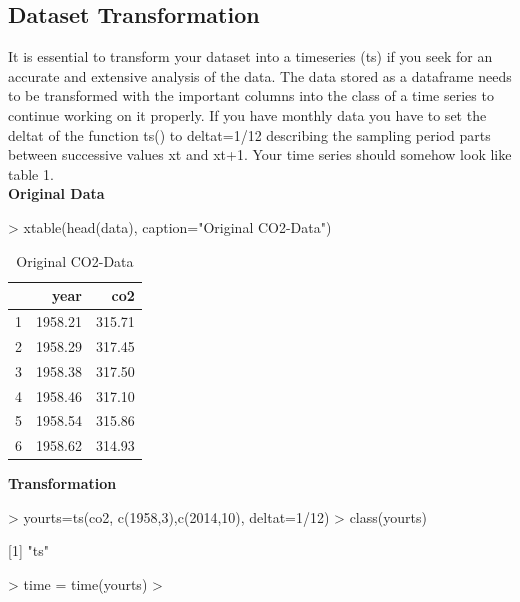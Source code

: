 \documentclass[11pt, a4paper]{article} %
\begin{document}
\subsection{Dataset Transformation}
It is essential to transform your dataset into a timeseries (ts) if you seek for an accurate and extensive analysis of the data.
\noindent The data stored as a dataframe needs to be transformed with the important columns into the class of a time series to continue working on it properly. If you have monthly data you have to set the deltat of the function ts() to deltat=1/12 describing the sampling period parts between successive values xt and xt+1. Your time series should somehow look like table 1.\\
\noindent \textbf{Original Data}\\
\begin{Schunk}
\begin{Sinput}
> xtable(head(data), caption="Original CO2-Data")
\end{Sinput}
\begin{table}[ht]
\centering
\begin{tabular}{rrr}
  \hline
 & year & co2 \\ 
  \hline
1 & 1958.21 & 315.71 \\ 
  2 & 1958.29 & 317.45 \\ 
  3 & 1958.38 & 317.50 \\ 
  4 & 1958.46 & 317.10 \\ 
  5 & 1958.54 & 315.86 \\ 
  6 & 1958.62 & 314.93 \\ 
   \hline
\end{tabular}
\caption{Original CO2-Data} 
\end{table}\end{Schunk}
\noindent \textbf{Transformation}\\
\begin{Schunk}
\begin{Sinput}
> yourts=ts(co2, c(1958,3),c(2014,10), deltat=1/12)
> class(yourts)
\end{Sinput}
[1] "ts"\begin{Sinput}
> time = time(yourts)
> 
\end{Sinput}
\end{Schunk}
\end{document}
